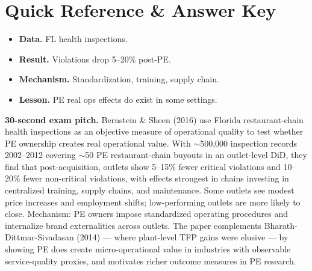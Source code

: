 \documentclass[11pt]{article}
\begin{document}
\section*{Quick Reference \& Answer Key}
\begin{answerbox}
\begin{itemize}
\item \textbf{Data.} FL health inspections.
\item \textbf{Result.} Violations drop 5--20\% post-PE.
\item \textbf{Mechanism.} Standardization, training, supply chain.
\item \textbf{Lesson.} PE real ops effects do exist in some settings.
\end{itemize}
\end{answerbox}

\begin{keybox}
\textbf{30-second exam pitch.} Bernstein \& Sheen (2016) use Florida restaurant-chain health inspections as an objective measure of operational quality to test whether PE ownership creates real operational value. With $\sim$500,000 inspection records 2002--2012 covering $\sim$50 PE restaurant-chain buyouts in an outlet-level DiD, they find that post-acquisition, outlets show 5--15\% fewer critical violations and 10--20\% fewer non-critical violations, with effects strongest in chains investing in centralized training, supply chains, and maintenance. Some outlets see modest price increases and employment shifts; low-performing outlets are more likely to close. Mechanism: PE owners impose standardized operating procedures and internalize brand externalities across outlets. The paper complements Bharath-Dittmar-Sivadasan (2014) --- where plant-level TFP gains were elusive --- by showing PE does create micro-operational value in industries with observable service-quality proxies, and motivates richer outcome measures in PE research.
\end{keybox}
\end{document}
